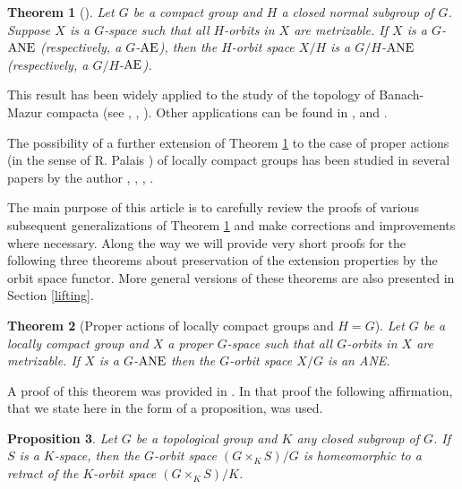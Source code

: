 \documentclass{amsart}
\newtheorem{theorem}{Theorem}[section]
\newtheorem{proposition}[theorem]{Proposition}
\begin{document}
\begin{theorem}[\cite{ant:99}]\label{T:compactcase}
Let $G$ be a compact group and  $H$  a closed normal subgroup of $G$. Suppose $X$ is a $G$-space such that all  $H$-orbits in $X$ are metrizable. 
 If  $X$ is a $G$-${\rm ANE}$ (respectively, a $G$-${\rm AE}$),  then the $H$-orbit space $X/H$ is a $G/H$-${\rm ANE}$ (respectively, a $G/H$-${\rm AE}$). 
\end{theorem}
  
  This result has been widely applied to the study of the topology of  Banach-Mazur compacta  (see \cite{ant:98}, \cite{ant:00}, \cite{ant:03}).  Other applications  can be found in \cite{ant:88}, \cite{bas:94} and \cite{zhur:90}.
  
\medskip

The possibility of a further extension of Theorem \ref{T:compactcase}
 to the case of proper actions (in the sense of R. Palais \cite{pal:61}) of locally compact groups has been studied in several papers by  the author \cite{ant:99}, \cite{ant:jap}, \cite{ant:proper}, \cite{ant:fund09}. 
 

\medskip


The main purpose of this article is to carefully review the proofs of various subsequent generalizations of Theorem \ref{T:compactcase}  and make  corrections and improvements where necessary. Along the  way we will provide very short proofs for  the following three theorems about preservation of the  extension properties by the orbit space functor.   More general versions of these theorems are also presented in Section \ref{lifting}.




 
        
        


\begin{theorem}[Proper actions of locally compact groups and $H=G$]\label{T:0}
Let $G$ be a locally compact  group and $X$   a proper $G$-space such that  all  $G$-orbits in $X$ are metrizable. 
 If  $X$ is a $G$-${\rm ANE}$ then the $G$-orbit space  $X/G$ is an {\rm ANE}. 
\end{theorem}


\smallskip

      A proof  of this theorem was provided in  \cite[Theorem 6.4]{ant:jap}. In that proof         
      the following affirmation, that we state here in the form of a proposition, was used.        
        
        
 \begin{proposition}\label{retractdirect}
 Let $G$ be a topological group and $K$ any closed subgroup of  $G$. If $S$ is a $K$-space, then the $G$-orbit space
 $({G \times_K S})/G$ is homeomorphic to a retract of  the $K$-orbit space $({G \times_K S})/K$.
 \end{proposition}
 
\end{document}
